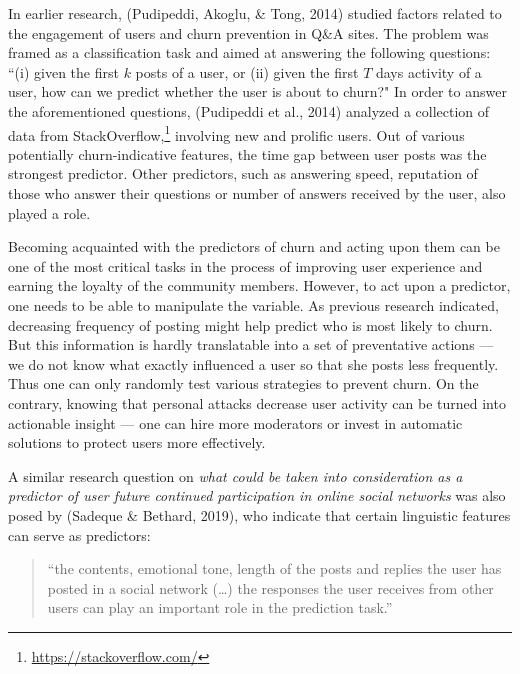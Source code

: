 \documentclass[10pt,dvipsnames]{scrartcl}
\begin{document}
In earlier research, (Pudipeddi, Akoglu, \& Tong, 2014) studied factors
related to the engagement of users and churn prevention in Q\&A sites.
The problem was framed as a classification task and aimed at answering
the following questions: ``(i) given the first \(k\) posts of a user, or
(ii) given the first \(T\) days activity of a user, how can we predict
whether the user is about to churn?" In order to answer the
aforementioned questions, (Pudipeddi et al., 2014) analyzed a collection
of data from StackOverflow,\footnote{\url{https://stackoverflow.com/}}
involving new and prolific users. Out of various potentially
churn-indicative features, the time gap between user posts was the
strongest predictor. Other predictors, such as answering speed,
reputation of those who answer their questions or number of answers
received by the user, also played a role.

Becoming acquainted with the predictors of churn and acting upon them
can be one of the most critical tasks in the process of improving user
experience and earning the loyalty of the community members. However, to
act upon a predictor, one needs to be able to manipulate the variable.
As previous research indicated, decreasing frequency of posting might
help predict who is most likely to churn. But this information is hardly
translatable into a set of preventative actions --- we do not know what
exactly influenced a user so that she posts less frequently. Thus one
can only randomly test various strategies to prevent churn. On the
contrary, knowing that personal attacks decrease user activity can be
turned into actionable insight --- one can hire more moderators or
invest in automatic solutions to protect users more effectively.

A similar research question on
\emph{what could be taken into consideration as a predictor of user future continued participation in online social networks}
was also posed by (Sadeque \& Bethard, 2019), who indicate that certain
linguistic features can serve as predictors:

\begin{quote}``the contents, emotional tone, length of the posts and replies the user has posted in a social network (\dots) the responses the user receives from other users can play an important role in the prediction task.''\end{quote}
\end{document}
